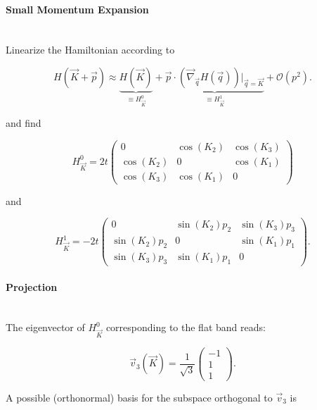\documentclass[../../../main.tex]{subfiles}
\begin{document}
\paragraph{Small Momentum Expansion} \hfill \\

Linearize the Hamiltonian according to 

\begin{equation}
	H(\vec{K}+ \vec{p}) \approx \underbrace{H(\vec{K})}_{\equiv H_{\vec{K}}^0} + \underbrace{\vec{p} \cdot \left(\vec{\nabla}_{\vec{q}}H(\vec{q})\right)\bigg\rvert_{\vec{q} = \vec{K}}}_{\equiv H_{\vec{K}}^1} + \mathcal{O}(p^2).
\end{equation}

and find 

\begin{equation}
	H_{\vec{K}}^0 = 2t
	\begin{pmatrix}
		0 & \cos(K_2) & \cos(K_3) \\
		\cos(K_2) & 0 & \cos(K_1) \\
		\cos(K_3) & \cos(K_1) & 0 
	\end{pmatrix}
\end{equation}

and 


\begin{equation}
	H_{\vec{K}}^1 = -2t
	\begin{pmatrix}
		0 & \sin(K_2)p_2 & \sin(K_3)p_3 \\
		\sin(K_2)p_2 & 0 & \sin(K_1)p_1 \\
		\sin(K_3)p_3 & \sin(K_1)p_1 & 0 
	\end{pmatrix}.
\end{equation}


\paragraph{Projection} \hfill \\

The eigenvector of $H_{\vec{K}}^0$ corresponding to the flat band reads:

\begin{equation}
	\vec{v}_3(\vec{K}) = \frac{1}{\sqrt{3}}
	\begin{pmatrix}
		-1 \\
		1 \\
		1
	\end{pmatrix}.
\end{equation}

A possible (orthonormal) basis for the subspace orthogonal to $\vec{v}_3$ is 
\end{document}
